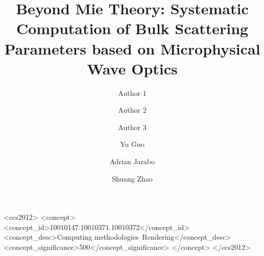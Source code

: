 \documentclass[acmtog,screen,balance=false]{acmart}
\title{Beyond Mie Theory: Systematic Computation of Bulk Scattering Parameters based on Microphysical Wave Optics}
\author{Author 1}
\affiliation{%
		\institution{Affiliation 1}%
		\country{Country 1}
	}
\author{Author 2}
\affiliation{%
		\institution{Affiliation 2}%
		\country{Country 2}
	}
\author{Author 3}
\affiliation{%
		\institution{Affiliation 3}%
		\country{Country 3}
	}
\author{Yu Guo}
\affiliation{%
		\institution{University of California, Irvine}%
		\country{USA}
	}
\author{Adrian Jarabo}
\affiliation{%
		\institution{Universidad de Zaragoza - I3A}%
		\country{Spain}
	}
\author{Shuang Zhao}
\affiliation{%
		\institution{University of California, Irvine}%
		\country{USA}
	}
\begin{document}
    
	\begin{CCSXML}
		<ccs2012>
		<concept>
		<concept_id>10010147.10010371.10010372</concept_id>
		<concept_desc>Computing methodologies~Rendering</concept_desc>
		<concept_significance>500</concept_significance>
		</concept>
		</ccs2012>
	\end{CCSXML}
    
    \maketitle
    
    
    
    
    
    
    
    
    
    
    \clearpage
    \appendix
    
\end{document}
